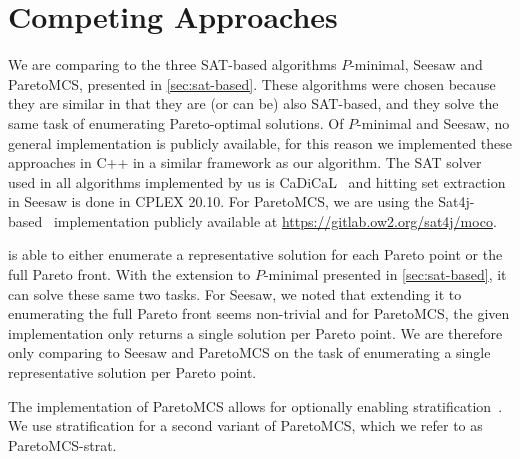 \section{Competing Approaches\label{sec:competing}}

We are comparing \algname{} to the three SAT-based algorithms $P$-minimal, Seesaw and ParetoMCS, presented in \cref{sec:sat-based}.
These algorithms were chosen because they are similar in that they are (or can be) also SAT-based, and they solve the same task of enumerating Pareto-optimal solutions.
Of $P$-minimal and Seesaw, no general implementation is publicly available, for this reason we implemented these approaches in C++ in a similar framework as our \algname{} algorithm.
The SAT solver used in all algorithms implemented by us is CaDiCaL~\autocite{BiereFazekasFleuryHeisinger-SAT-Competition-2020-solvers} and hitting set extraction in Seesaw is done in CPLEX 20.10.
For ParetoMCS, we are using the Sat4j-based~\autocite{DBLP:journals/jsat/BerreP10} implementation publicly available at \url{https://gitlab.ow2.org/sat4j/moco}.

\algname{} is able to either enumerate a representative solution for each Pareto point or the full Pareto front.
With the extension to $P$-minimal presented in \cref{sec:sat-based}, it can solve these same two tasks.
For Seesaw, we noted that extending it to enumerating the full Pareto front seems non-trivial and for ParetoMCS, the given implementation only returns a single solution per Pareto point.
We are therefore only comparing to Seesaw and ParetoMCS on the task of enumerating a single representative solution per Pareto point.

The implementation of ParetoMCS allows for optionally enabling stratification~\autocite{DBLP:conf/ijcai/Terra-NevesLM18}.
We use stratification for a second variant of ParetoMCS, which we refer to as ParetoMCS-strat.

